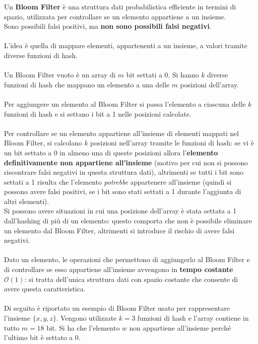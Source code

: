 \documentclass[a4paper, 12pt, oneside]{book}
\theoremstyle{normal}
\begin{document}
Un \textbf{Bloom Filter} \cite{enwiki:1158711110} è una struttura dati probabilistica efficiente in termini di spazio, utilizzata per controllare se un elemento appartiene a un insieme. \\ Sono possibili falsi positivi, ma \textbf{non sono possibili falsi negativi}. \\ \\ L'idea è quella di mappare elementi, appartenenti a un insieme, a valori tramite diverse funzioni di hash. \\ \\ Un Bloom Filter vuoto è un array di $m$ bit settati a 0. Si hanno $k$ diverse funzioni di hash che mappano un elemento a una delle $m$ posizioni dell'array. \\ \\ Per aggiungere un elemento al Bloom Filter si passa l'elemento a ciascuna delle $k$ funzioni di hash e si settano i bit a 1 nelle posizioni calcolate. \\ \\ Per controllare se un elemento appartiene all'insieme di elementi mappati nel Bloom Filter, si calcolano $k$ posizioni nell'array tramite le funzioni di hash: se vi è un bit settato a 0 in almeno una di queste posizioni allora l'\textbf{elemento definitivamente non appartiene all'insieme} (motivo per cui non si possono riscontrare falsi negativi in questa struttura dati), altrimenti se tutti i bit sono settati a 1 risulta che l'elemento \emph{potrebbe} appartenere all'insieme (quindi si possono avere falsi positivi, se i bit sono stati settati a 1 durante l'aggiunta di altri elementi). \\ Si possono avere situazioni in cui una posizione dell'array è stata settata a 1 dall'hashing di più di un elemento: questo comporta che non è possibile eliminare un elemento dal Bloom Filter, altrimenti si introduce il rischio di avere falsi negativi. \\ \\ Dato un elemento, le operazioni che permettono di aggiungerlo al Bloom Filter e di controllare se esso appartiene all'insieme avvengono in \textbf{tempo costante} $\mathcal{O}(1)$: si tratta dell'unica struttura dati con spazio costante che consente di avere questa caratteristica.
\\ \\ Di seguito è riportato un esempio di Bloom Filter usato per rappresentare l'insieme $\{x, y, z\}$. Vengono utilizzate $k = 3$ funzioni di hash e l'array contiene in tutto $m = 18$ bit. Si ha che l'elemento $w$ non appartiene all'insieme perché l'ultimo bit è settato a 0. \\
\end{document}
